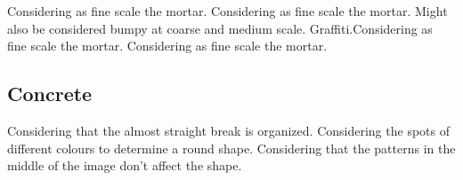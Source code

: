 \renewcommand{\imgNumber}{01}
{}{}
\renewcommand{\imgNumber}{02}
{}{Considering as fine scale the mortar.}
\renewcommand{\imgNumber}{03}
{}{Considering as fine scale the mortar.}
\renewcommand{\imgNumber}{04}
{}{}
\renewcommand{\imgNumber}{05}
{}{Might also be considered bumpy at coarse and medium scale.}
\renewcommand{\imgNumber}{06}
{Graffiti.}{Considering as fine scale the mortar.}
\renewcommand{\imgNumber}{07}
{}{}
\renewcommand{\imgNumber}{08}
{}{}
\renewcommand{\imgNumber}{09}
{}{}
\renewcommand{\imgNumber}{10}
{}{Considering as fine scale the mortar.}
\renewcommand{\imgNumber}{11}
{}{}
\renewcommand{\imgNumber}{12}
{}{}

\clearpage
\renewcommand{\matName}{Concrete}
\subsection{\matName}

\renewcommand{\imgNumber}{01}
{}{}
\renewcommand{\imgNumber}{02}
{}{}
\renewcommand{\imgNumber}{03}
{}{}
\renewcommand{\imgNumber}{04}
{}{}
\renewcommand{\imgNumber}{05}
{}{}
\renewcommand{\imgNumber}{06}
{}{Considering that the almost straight break is organized.}
\renewcommand{\imgNumber}{07}
{}{Considering the spots of different colours to determine a round shape.}
\renewcommand{\imgNumber}{08}
{}{Considering that the patterns in the middle of the image don't affect the shape.}
\renewcommand{\imgNumber}{09}
{}{}
\renewcommand{\imgNumber}{10}
{}{}
\renewcommand{\imgNumber}{11}
{}{}
\renewcommand{\imgNumber}{12}
{}{}

